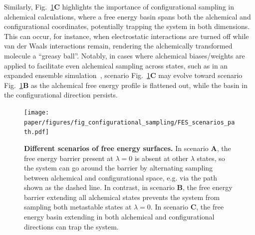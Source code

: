 \documentclass[9pt,bestpractices]{livecoms}
\begin{document}
Similarly, Fig.~\ref{fig:configurational_sampling}\textbf{C} highlights the importance of configurational sampling in alchemical calculations, where a free energy basin spans both the alchemical and configurational coordinates, potentially trapping the system in both dimensions. This can occur, for instance, when electrostatic interactions are turned off while van der Waals interactions remain, rendering the alchemically transformed molecule a ``greasy ball''. Notably, in cases where alchemical biases/weights are applied to facilitate even alchemical sampling across states, such as in an expanded ensemble simulation~\cite{lyubartsev1992new}, scenario Fig.~\ref{fig:configurational_sampling}\textbf{C} may evolve toward scenario Fig.~\ref{fig:configurational_sampling}\textbf{B} as the alchemical free energy profile is flattened out, while the basin in the configurational direction persists. 

\begin{figure}
    \texttt{[image: paper/figures/fig\_configurational\_sampling/FES\_scenarios\_path.pdf]}
    \caption{\textbf{Different scenarios of free energy surfaces.} In scenario \textbf{A}, the free energy barrier present at $\lambda=0$ is absent at other $\lambda$ states, so the system can go around the barrier by alternating sampling between alchemical and configurational space, e.g. via the path shown as the dashed line. In contrast, in scenario \textbf{B}, the free energy barrier extending all alchemical states prevents the system from sampling both metastable states at $\lambda=0$. In scenario \textbf{C}, the free energy basin extending in both alchemical and configurational directions can trap the system.}
    \label{fig:configurational_sampling}
\end{figure} 
\end{document}
